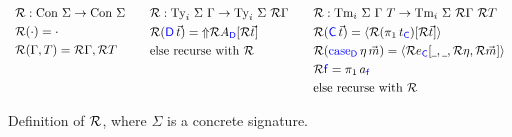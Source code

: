 \begin{figure}[h]
  \[
    \begin{array}[t]{ccc}
      \begin{aligned}[t]
         & \mathcal{R} {}          : \textrm{Con} \ \Sigma  \to \textrm{Con} \ \Sigma \\
         & \mathcal{R} {(\cdot)}     = \cdot                          \\
         & \mathcal{R} {(\Gamma, T)} = \mathcal{R} {\Gamma}, \mathcal{R} {T}
      \end{aligned}                                            & \quad
      \begin{aligned}[t]
         & \mathcal{R} {}          : \textrm{Ty}_i \ \Sigma \ \Gamma  \to \textrm{Ty}_i \ \Sigma \ \mathcal{R} {\Gamma} \\
         & \mathcal{R} {({\color{blue}{\mathsf{D}}}\,\vec{t})}     = \text{$\Uparrow$}{ \mathcal{R} {A_{{\ensuremath{\color{blue}{\mathsf{D}}}}}} [\mathcal{R} {\vec{t}}] }  \\
         & \text{else recurse with $\mathcal{R} {}$}                                              \\
      \end{aligned} \quad &
      \begin{aligned}[t]
         & \mathcal{R} {}          : \textrm{Tm}_i \ \Sigma \ \Gamma \ T  \to \textrm{Tm}_i \ \Sigma \ \mathcal{R} {\Gamma} \ \mathcal{R} {T}                   \\
         & \mathcal{R} {({\color{blue}{\mathsf{C}}}\,\vec{t})}     = \langle{\mathcal{R} {(\pi_1\, t_{{\ensuremath{\color{blue}{\mathsf{C}}}}})} [\mathcal{R} {\vec{t}}]}\rangle                            \\
         & \mathcal{R} {({\color{blue}{\mathsf{\textrm{case}_{D}}}}\,\eta\,\vec{m})}     = \langle{\mathcal{R} {e_{{\ensuremath{\color{blue}{\mathsf{C}}}}}} [\underline{\hspace{0.4em}},\underline{\hspace{0.4em}},\mathcal{R} {\eta},\mathcal{R} {\vec{m}}]}\rangle \\
         & \mathcal{R} {{\color{blue}{\mathsf{f}}}}     = \pi_1\, a_{{\color{blue}{\mathsf{f}}}}                                                                          \\
         & \text{else recurse with $\mathcal{R} {}$}                                                                                \\
      \end{aligned}
    \end{array}
  \]
  \caption{Definition of $\mathcal{R} {}$, where $\Sigma$ is a concrete signature.}
  \label{fig:repr-rules}
\end{figure}
